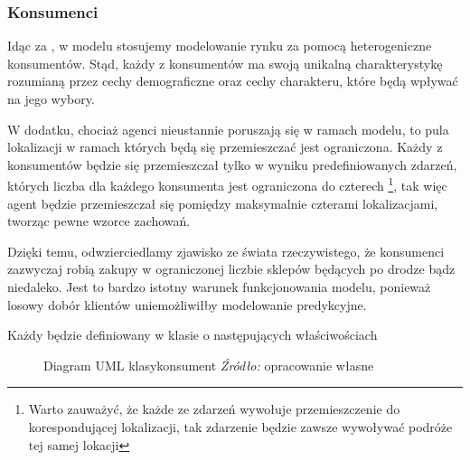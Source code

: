 \documentclass[polish, twoside, 12pt, a4paper]{article}
\theoremstyle{definition}
\theoremstyle{plain}
\theoremstyle{remark}
\begin{document}
\subsubsection{Konsumenci} \label{chapter:konsumenci}

Idąc za \cite{Kaminski2012}, w modelu stosujemy modelowanie rynku za pomocą heterogeniczne konsumentów. Stąd, każdy z konsumentów ma swoją unikalną charakterystykę rozumianą przez cechy demograficzne oraz cechy charakteru, które będą wpływać na jego wybory. 

W dodatku, chociaż agenci nieustannie poruszają się w ramach modelu, to pula lokalizacji w ramach których będą się przemieszczać jest ograniczona. Każdy z konsumentów będzie się przemieszczał tylko w wyniku predefiniowanych zdarzeń, których liczba dla każdego konsumenta jest ograniczona do czterech \footnote{Warto zauważyć, że każde ze zdarzeń wywołuje przemieszczenie do korespondującej lokalizacji, tak zdarzenie będzie zawsze wywoływać podróże tej samej lokacji}, tak więc agent będzie przemieszczał się pomiędzy maksymalnie czterami lokalizacjami, tworząc pewne wzorce zachowań. 

Dzięki temu, odwzierciedlamy zjawisko ze świata rzeczywistego, że konsumenci zazwyczaj robią zakupy w ograniczonej liczbie sklepów będących po drodze bądz niedaleko. Jest to bardzo istotny warunek funkcjonowania modelu, ponieważ losowy dobór klientów uniemożliwiłby modelowanie predykcyjne.

Każdy będzie definiowany w klasie o następujących właściwościach \\


\begin{figure}[hbt]
  \centering
{}
  \captionsetup{margin=10pt,font=small,labelfont=bf,width=.8\textwidth}
  \caption[Diagram UML klasy konsument]{Diagram UML klasykonsument \textit{Źródło:} opracowanie własne}\label{UML:swiat}
\end{figure}
\end{document}
